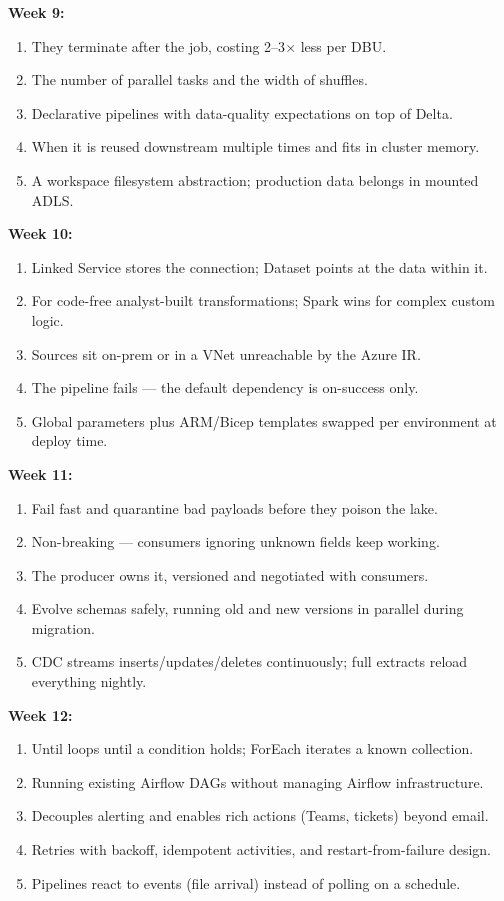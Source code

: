 \documentclass[11pt, a4paper]{article}
\begin{document}
\noindent\textbf{Week 9:}
\begin{enumerate}[itemsep=0pt]
    \item They terminate after the job, costing 2--3$\times$ less per DBU.
    \item The number of parallel tasks and the width of shuffles.
    \item Declarative pipelines with data-quality expectations on top of Delta.
    \item When it is reused downstream multiple times and fits in cluster memory.
    \item A workspace filesystem abstraction; production data belongs in mounted ADLS.
\end{enumerate}
\noindent\textbf{Week 10:}
\begin{enumerate}[itemsep=0pt]
    \item Linked Service stores the connection; Dataset points at the data within it.
    \item For code-free analyst-built transformations; Spark wins for complex custom logic.
    \item Sources sit on-prem or in a VNet unreachable by the Azure IR.
    \item The pipeline fails --- the default dependency is on-success only.
    \item Global parameters plus ARM/Bicep templates swapped per environment at deploy time.
\end{enumerate}
\noindent\textbf{Week 11:}
\begin{enumerate}[itemsep=0pt]
    \item Fail fast and quarantine bad payloads before they poison the lake.
    \item Non-breaking --- consumers ignoring unknown fields keep working.
    \item The producer owns it, versioned and negotiated with consumers.
    \item Evolve schemas safely, running old and new versions in parallel during migration.
    \item CDC streams inserts/updates/deletes continuously; full extracts reload everything nightly.
\end{enumerate}
\noindent\textbf{Week 12:}
\begin{enumerate}[itemsep=0pt]
    \item Until loops until a condition holds; ForEach iterates a known collection.
    \item Running existing Airflow DAGs without managing Airflow infrastructure.
    \item Decouples alerting and enables rich actions (Teams, tickets) beyond email.
    \item Retries with backoff, idempotent activities, and restart-from-failure design.
    \item Pipelines react to events (file arrival) instead of polling on a schedule.
\end{enumerate}
\end{document}
